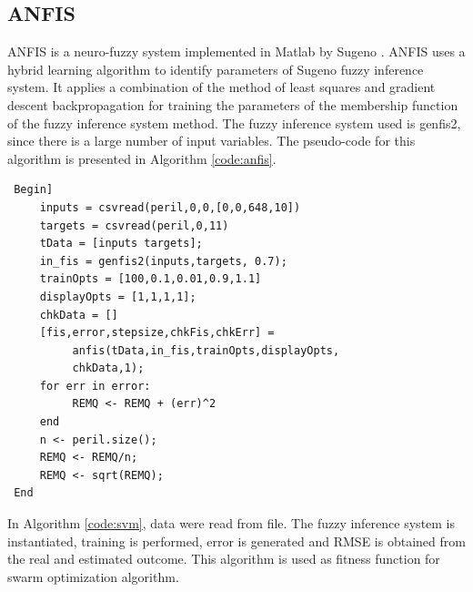 \subsection{ANFIS}

ANFIS is a neuro-fuzzy system implemented in Matlab by Sugeno \cite{jang1997neuro}. ANFIS uses a hybrid learning algorithm to identify parameters of Sugeno fuzzy inference system. It applies a combination of the method of least squares and gradient descent backpropagation for training the parameters of the membership function of the fuzzy inference system method. The fuzzy inference system used is genfis2, since there is a large number of input variables. The pseudo-code for this algorithm is presented in Algorithm \ref{code:anfis}.

\begin{small}
\label{code:anfis}
\begin{verbatim}
 Begin]
     inputs = csvread(peril,0,0,[0,0,648,10])
     targets = csvread(peril,0,11)
     tData = [inputs targets];
     in_fis = genfis2(inputs,targets, 0.7);
     trainOpts = [100,0.1,0.01,0.9,1.1]
     displayOpts = [1,1,1,1];
     chkData = []
     [fis,error,stepsize,chkFis,chkErr] = 
          anfis(tData,in_fis,trainOpts,displayOpts,
          chkData,1);
     for err in error:
          REMQ <- REMQ + (err)^2
     end
     n <- peril.size();
     REMQ <- REMQ/n;
     REMQ <- sqrt(REMQ);
 End
\end{verbatim}
\end{small}

In Algorithm \ref{code:svm}, data were read from file. The fuzzy inference system is instantiated, training is performed, error is generated and RMSE is obtained from the real and estimated outcome. This algorithm is used as fitness function for swarm optimization algorithm.

\pagebreak